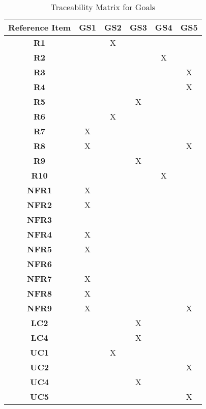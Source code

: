 \begin{table}[ht]
\centering
\begin{tabular}{|c|c|c|c|c|c|}
\hline
\textbf{Reference Item} & \textbf{GS1} & \textbf{GS2} & \textbf{GS3} & \textbf{GS4} & \textbf{GS5} \\ \hline
\textbf{R1} & &X & & & \\ \hline
\textbf{R2} & & & &X & \\ \hline
\textbf{R3} & & & & &X \\ \hline
\textbf{R4} & & & & &X \\ \hline
\textbf{R5} & & &X & & \\ \hline
\textbf{R6} & &X & & & \\ \hline
\textbf{R7} &X & & & & \\ \hline
\textbf{R8} &X & & & &X \\ \hline
\textbf{R9} & & &X & & \\ \hline
\textbf{R10} & & & &X & \\ \hline
\textbf{NFR1} &X & & & & \\ \hline
\textbf{NFR2} &X & & & & \\ \hline
\textbf{NFR3} & & & & & \\ \hline
\textbf{NFR4} &X & & & & \\ \hline
\textbf{NFR5} &X & & & & \\ \hline
\textbf{NFR6} & & & & & \\ \hline
\textbf{NFR7} &X & & & & \\ \hline
\textbf{NFR8} &X & & & & \\ \hline
\textbf{NFR9} &X & & & &X \\ \hline
\textbf{LC2} & & &X & & \\ \hline
\textbf{LC4} & & &X & & \\ \hline
\textbf{UC1} & &X & & & \\ \hline
\textbf{UC2} & & & & &X \\ \hline
\textbf{UC4} & & &X & & \\ \hline
\textbf{UC5} & & & & &X \\ \hline
\end{tabular}
\caption{Traceability Matrix for Goals}
\label{table:goals_traceability}
\end{table}


